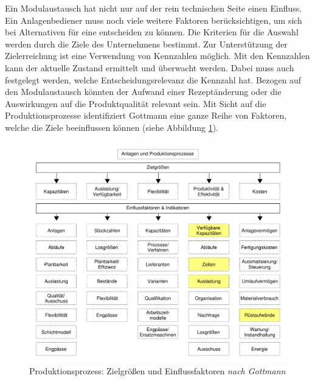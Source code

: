 Ein Modulaustausch hat nicht nur auf der rein technischen Seite einen Einfluss. Ein Anlagenbediener muss noch viele weitere Faktoren berücksichtigen, um sich bei Alternativen für eine entscheiden zu können. Die Kriterien für die Auswahl werden durch die Ziele des Unternehmens bestimmt. Zur Unterstützung der Zielerreichung ist eine Verwendung von Kennzahlen möglich. Mit den Kennzahlen kann der aktuelle Zustand ermittelt und überwacht werden. Dabei muss auch festgelegt werden, welche Entscheidungsrelevanz die Kennzahl hat.  Bezogen auf den Modulaustausch könnten der Aufwand einer Rezeptänderung oder die Auswirkungen auf die Produktqualität relevant sein. Mit Sicht auf die Produktionsprozesse identifiziert Gottmann \cite{Gottmann2016} eine ganze Reihe von Faktoren, welche die Ziele beeinflussen können (siehe Abbildung \ref{pic:Produktionsprozesse-Zielgroessen}).
\begin{figure}[htb]
\centering
\includegraphics[scale=0.5]{DA_files/Bilder/Analyse/Produktionsprozesse-Zielgroessen.pdf}
\caption[Produktionsprozess: Zielgrößen und Einflussfaktoren \textit{nach Gottmann}]{Produktionsprozess: Zielgrößen und Einflussfaktoren \textit{nach Gottmann} \citep[50]{Gottmann2016}}
\label{pic:Produktionsprozesse-Zielgroessen}
\end{figure}

